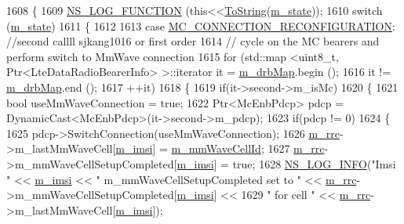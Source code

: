 \begin{DoxyCode}
1608 \{
1609   \hyperlink{log-macros-disabled_8h_a90b90d5bad1f39cb1b64923ea94c0761}{NS\_LOG\_FUNCTION} (\textcolor{keyword}{this}<<\hyperlink{namespacens3_a3d1f7e1bec1972e2ae8d64673fcfcd9c}{ToString}(\hyperlink{classns3_1_1UeManager_aaed4b2490297cb912e743084f1a27b08}{m\_state}));
1610   \textcolor{keywordflow}{switch} (\hyperlink{classns3_1_1UeManager_aaed4b2490297cb912e743084f1a27b08}{m\_state})
1611     \{
1612     
1613     \textcolor{keywordflow}{case} \hyperlink{classns3_1_1UeManager_a2f4085fdd18d7125c27da44a5b8b6808a263ff177d041c66b6a07b69e2be5562e}{MC\_CONNECTION\_RECONFIGURATION}: \textcolor{comment}{//second callll sjkang1016 or first
       order}
1614           \textcolor{comment}{// cycle on the MC bearers and perform switch to MmWave connection}
1615       \textcolor{keywordflow}{for} (std::map <uint8\_t, Ptr<LteDataRadioBearerInfo> >::iterator it =  
      \hyperlink{classns3_1_1UeManager_a18499c025730b63c73e5d93effff57aa}{m\_drbMap}.begin ();
1616            it != \hyperlink{classns3_1_1UeManager_a18499c025730b63c73e5d93effff57aa}{m\_drbMap}.end ();
1617            ++it)
1618         \{
1619           \textcolor{keywordflow}{if}(it->second->m\_isMc)
1620           \{
1621             \textcolor{keywordtype}{bool} useMmWaveConnection = \textcolor{keyword}{true};
1622             Ptr<McEnbPdcp> pdcp = DynamicCast<McEnbPdcp>(it->second->m\_pdcp);
1623             \textcolor{keywordflow}{if}(pdcp != 0)
1624             \{
1625               pdcp->SwitchConnection(useMmWaveConnection);
1626               \hyperlink{classns3_1_1UeManager_ab4405e9f354c66e7c1a4c95832290f5b}{m\_rrc}->m\_lastMmWaveCell[\hyperlink{classns3_1_1UeManager_a868dda076ecfc1d4202e357c16223d84}{m\_imsi}] = \hyperlink{classns3_1_1UeManager_a0f53cb816bd8a3ad6227dc9adca671b2}{m\_mmWaveCellId};
1627               \hyperlink{classns3_1_1UeManager_ab4405e9f354c66e7c1a4c95832290f5b}{m\_rrc}->m\_mmWaveCellSetupCompleted[\hyperlink{classns3_1_1UeManager_a868dda076ecfc1d4202e357c16223d84}{m\_imsi}] = \textcolor{keyword}{true};
1628               \hyperlink{group__logging_gafbd73ee2cf9f26b319f49086d8e860fb}{NS\_LOG\_INFO}(\textcolor{stringliteral}{"Imsi "} << \hyperlink{classns3_1_1UeManager_a868dda076ecfc1d4202e357c16223d84}{m\_imsi} << \textcolor{stringliteral}{" m\_mmWaveCellSetupCompleted set to "} << 
      \hyperlink{classns3_1_1UeManager_ab4405e9f354c66e7c1a4c95832290f5b}{m\_rrc}->m\_mmWaveCellSetupCompleted[\hyperlink{classns3_1_1UeManager_a868dda076ecfc1d4202e357c16223d84}{m\_imsi}] << 
1629                 \textcolor{stringliteral}{" for cell "} <<  \hyperlink{classns3_1_1UeManager_ab4405e9f354c66e7c1a4c95832290f5b}{m\_rrc}->m\_lastMmWaveCell[\hyperlink{classns3_1_1UeManager_a868dda076ecfc1d4202e357c16223d84}{m\_imsi}]);

\end{DoxyCode}
